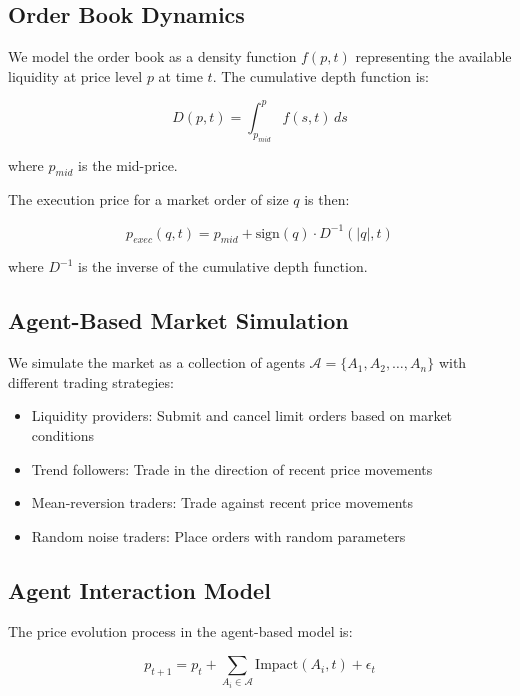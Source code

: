 \documentclass{article}
\begin{document}
\subsection{Order Book Dynamics}

We model the order book as a density function $f(p, t)$ representing the available liquidity at price level $p$ at time $t$. The cumulative depth function is:

\begin{equation}
D(p, t) = \int_{p_{mid}}^{p} f(s, t) \, ds
\end{equation}

where $p_{mid}$ is the mid-price.

The execution price for a market order of size $q$ is then:

\begin{equation}
p_{exec}(q, t) = p_{mid} + \text{sign}(q) \cdot D^{-1}(|q|, t)
\end{equation}

where $D^{-1}$ is the inverse of the cumulative depth function.

\subsection{Agent-Based Market Simulation}

We simulate the market as a collection of agents $\mathcal{A} = \{A_1, A_2, \ldots, A_n\}$ with different trading strategies:

\begin{itemize}
    \item Liquidity providers: Submit and cancel limit orders based on market conditions
    \item Trend followers: Trade in the direction of recent price movements
    \item Mean-reversion traders: Trade against recent price movements
    \item Random noise traders: Place orders with random parameters
\end{itemize}

\subsection{Agent Interaction Model}

The price evolution process in the agent-based model is:

\begin{equation}
p_{t+1} = p_t + \sum_{A_i \in \mathcal{A}} \text{Impact}(A_i, t) + \epsilon_t
\end{equation}
\end{document}
